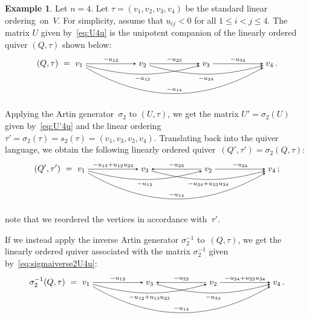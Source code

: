 \documentclass[11pt, letterpaper]{amsart}
\theoremstyle{definition}
\newtheorem{example}[theorem]{Example}
\numberwithin{equation}{section}
\begin{document}
\begin{example}
\label{eg:sigma3sigma2-LOQ}
Let $n=4$. Let $\tau=(v_1,v_2,v_3,v_4)$ be the standard linear ordering~on~$V$. 
For simplicity, assume that $u_{ij}<0$ for all $1\le i<j\le 4$. 
The matrix $U$ given by~\eqref{eq:U4u} is the unipotent companion of the linearly ordered quiver
$(Q,\tau)$ shown below: 
\vspace{2pt}
\begin{equation}
\label{eq:Qtau-4vert}
(Q,\tau)\ =\  \begin{tikzcd}[arrows={-stealth}, sep=small, cramped, sep=60]
v_1 \ar[r, "-u_{12}"] \ar[rr, swap, bend right=15, "-u_{13}"] \ar[rrr,  bend right=30, "-u_{14}"] &    
v_2 \ar[r, "-u_{23}"]  \ar[rr, swap, bend right=15, "-u_{24}"]  &    
v_3 \ar[r, "-u_{34}"] &    
v_4
\end{tikzcd}\,.
\vspace{-5pt}
\end{equation}
Applying the Artin generator~$\sigma_2$ to $(U,\tau)$, we get the matrix $U'=\sigma_2(U)$ given by~\eqref{eq:U'4u}
and the linear ordering $\tau'=\sigma_2(\tau)=s_2(\tau)=(v_1,v_3,v_2,v_4)$. 
Translating back into the quiver language, we obtain the following linearly ordered quiver~$(Q',\tau')=\sigma_2(Q,\tau)$: \vspace{2pt}
\begin{equation*}
(Q',\tau')\ =\ \begin{tikzcd}[arrows={-stealth}, sep=small, cramped, sep=60]
v_1 \ar[r, "-u_{13}+u_{12}u_{23}"] \ar[rr, swap, bend right=15, "-u_{12}"] \ar[rrr,  bend right=30, "-u_{14}"] &    
v_3  \ar[rr, swap, bend right=15, "-u_{34}+u_{23}u_{24}"]  &    
v_2 \ar[r, "-u_{24}"] \ar[l, swap, "-u_{23}"] &    
v_4
\end{tikzcd}\,;
\vspace{-5pt}
\end{equation*}
note that we reordered the vertices in accordance with~$\tau'$. 

\pagebreak[3]

If we instead apply the inverse Artin generator $\sigma_2^{-1}$ to~$(Q,\tau)$,
we get the linearly ordered quiver associated with the matrix $\sigma_2^{-1}$
given by~\eqref{eq:sigmaiverse2U4u}:
\vspace{2pt}
\begin{equation}
\label{eq:sigma2inverse(Q,tau)}
\sigma_2^{-1}(Q,\tau)\ =\ \begin{tikzcd}[arrows={-stealth}, sep=small, cramped, sep=60]
v_1 \ar[r, "-u_{13}"] \ar[rr, swap, bend right=15, "-u_{12}+u_{13}u_{23}"] \ar[rrr,  bend right=30, "-u_{14}"] &    
v_3  \ar[rr, swap, bend right=15, "-u_{34}"]  &    
v_2 \ar[r, "-u_{24}+u_{23}u_{34}"] \ar[l, swap, "-u_{23}"] &    
v_4
\end{tikzcd}\,.
\vspace{-5pt}
\end{equation}



\end{example}
\end{document}
